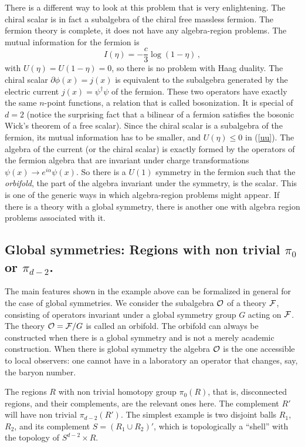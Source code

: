 \documentclass[12pt]{article}
\numberwithin{equation}{section}
\newcommand{\be}{\begin{equation}}
\newcommand{\ee}{\end{equation}}
\begin{document}
There is a different way to look at this problem that is very enlightening. The chiral scalar is in fact a subalgebra of the chiral free massless fermion. The fermion theory is complete, it does not have any algebra-region problems. The mutual information for the fermion is
\be
I(\eta)=-\frac{c}{3} \log(1-\eta)\,,
\ee
with $U(\eta)=U(1-\eta)=0$, so there is no problem with Haag duality. 
The chiral scalar $\partial \phi(x)=j(x)$ is equivalent to the subalgebra generated by the electric current $j(x)=\psi^\dagger\psi$ of the fermion. These two operators have exactly the same $n$-point functions, a relation that is called bosonization. It is special of $d=2$ (notice the surprising fact that a bilinear of a fermion satisfies the bosonic Wick's theorem of a free scalar). Since the chiral scalar is a subalgebra of the fermion, its mutual information has to be smaller, and $U(\eta)\le 0$ in (\ref{uu}).
 The algebra of the current (or the chiral scalar) is exactly formed by the operators of the fermion algebra that are invariant under charge transformations $\psi(x)\rightarrow e^{i\alpha} \psi(x)$. So there is a $U(1)$ symmetry in the fermion such that the {\sl orbifold}, the part of the algebra invariant under the symmetry, is the scalar. This is one of the generic ways in which algebra-region problems might appear. If there is a theory with a global symmetry, there is another one with algebra region problems associated with it.   



\subsection{Global symmetries: Regions with non trivial $\pi_0$ or $\pi_{d-2}$.}
\label{global}
The main features shown in the example above can be formalized in general for the case of global symmetries. 
We consider the subalgebra ${\cal O}$ of a theory ${\cal F}$, consisting of operators invariant under a global symmetry group $G$ acting on ${\cal F}$. The theory ${\cal O}={\cal F}/G$ is called an orbifold. The orbifold can always be constructed when there is a global symmetry and is not a merely academic construction. When there is global symmetry the algebra ${\cal O}$ is the one accessible to local observers: one cannot have in a laboratory an operator that changes, say, the baryon number.     

The regions $R$ with non trivial homotopy group $\pi_0(R)$, that is, disconnected regions, and their complements,  are the relevant ones here. The complement $R'$ will have non trivial $\pi_{d-2}(R')$.  The simplest example is two disjoint balls $R_1$, $R_2$, and its complement $S=(R_1\cup R_2)'$, which is topologically a ``shell'' with the topology of $S^{d-2}\times R$. 
\end{document}
